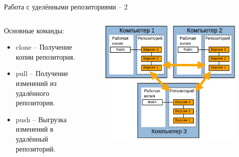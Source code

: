 \documentclass[presentation]{beamer}
\begin{document}
\begin{frame}{Работа с уделёнными репозиториями -- 2}
  \begin{columns}
    \begin{column}{.5\textwidth}
      Основные команды:
      \begin{itemize}
      \item \alert{clone} -- Получение копии репозитория.
      \item \alert{pull} -- Получение изменений из удалённого
        репозитория.
      \item \alert{push} -- Выгрузка изменений в удалённый
        репозиторий.
      \end{itemize}
    \end{column}
    \begin{column}{.5\textwidth}
      \begin{figure}[htb]
        \centering
        \includegraphics[height=.6\textheight]{vcs-decentralized}
      \end{figure}
    \end{column}
  \end{columns}
\end{frame}
\end{document}

